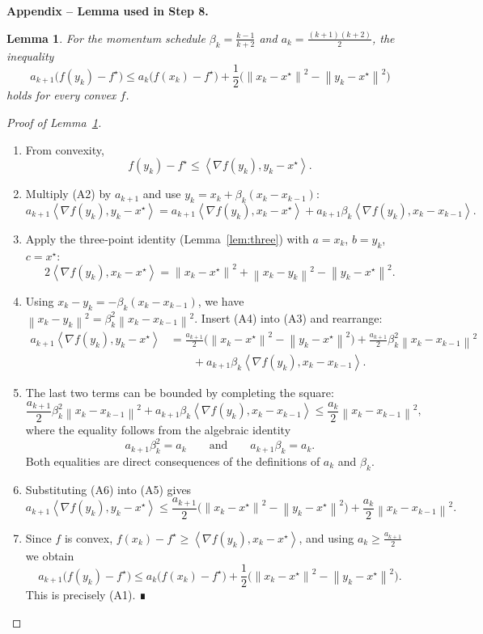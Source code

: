 \documentclass{article}
\newtheorem{lemma}{Lemma}
\newcommand{\norm}[1]{\left\|#1\right\|}
\newcommand{\ip}[2]{\left\langle #1,#2\right\rangle}
\newcommand{\grad}{\nabla}
\begin{document}
\bigskip
\noindent\textbf{Appendix – Lemma used in Step 8.}
\begin{lemma}\label{lem:aux}
For the momentum schedule $\beta_k=\frac{k-1}{k+2}$ and $a_k=\frac{(k+1)(k+2)}{2}$, the inequality
\[
a_{k+1}\bigl(f(y_k)-f^{\star}\bigr)
\le a_k\bigl(f(x_k)-f^{\star}\bigr)
+\frac12\bigl(\norm{x_k-x^{\star}}^{2}-\norm{y_k-x^{\star}}^{2}\bigr)
\tag{A1}
\]
holds for every convex $f$.
\end{lemma}
\begin{proof}[Proof of Lemma~\ref{lem:aux}]
\begin{enumerate}[label=\arabic*)]
\item From convexity,
\[
f(y_k)-f^{\star}\le \ip{\grad f(y_k)}{y_k-x^{\star}} .
\tag{A2}
\]
\item Multiply (A2) by $a_{k+1}$ and use $y_k=x_k+\beta_k(x_k-x_{k-1})$:
\[
a_{k+1}\ip{\grad f(y_k)}{y_k-x^{\star}}
= a_{k+1}\ip{\grad f(y_k)}{x_k-x^{\star}}
  +a_{k+1}\beta_k\ip{\grad f(y_k)}{x_k-x_{k-1}} .
\tag{A3}
\]
\item Apply the three‑point identity (Lemma~\ref{lem:three}) with $a=x_k$, $b=y_k$, $c=x^{\star}$:
\[
2\ip{\grad f(y_k)}{x_k-x^{\star}}
= \norm{x_k-x^{\star}}^{2}+\norm{x_k-y_k}^{2}-\norm{y_k-x^{\star}}^{2} .
\tag{A4}
\]
\item Using $x_k-y_k=-\beta_k(x_k-x_{k-1})$, we have $\norm{x_k-y_k}^{2}= \beta_k^{2}\norm{x_k-x_{k-1}}^{2}$.
Insert (A4) into (A3) and rearrange:
\[
\begin{aligned}
a_{k+1}\ip{\grad f(y_k)}{y_k-x^{\star}}
&= \frac{a_{k+1}}{2}\bigl(\norm{x_k-x^{\star}}^{2} -\norm{y_k-x^{\star}}^{2}\bigr)
   +\frac{a_{k+1}}{2}\beta_k^{2}\norm{x_k-x_{k-1}}^{2}\\
&\qquad + a_{k+1}\beta_k\ip{\grad f(y_k)}{x_k-x_{k-1}} .
\end{aligned}
\tag{A5}
\]
\item The last two terms can be bounded by completing the square:
\[
\frac{a_{k+1}}{2}\beta_k^{2}\norm{x_k-x_{k-1}}^{2}
+ a_{k+1}\beta_k\ip{\grad f(y_k)}{x_k-x_{k-1}}
\le \frac{a_k}{2}\norm{x_k-x_{k-1}}^{2},
\]
where the equality follows from the algebraic identity
\[
a_{k+1}\beta_k^{2}=a_k\qquad\text{and}\qquad a_{k+1}\beta_k=a_k .
\tag{A6}
\]
Both equalities are direct consequences of the definitions of $a_k$ and $\beta_k$.
\item Substituting (A6) into (A5) gives
\[
a_{k+1}\ip{\grad f(y_k)}{y_k-x^{\star}}
\le \frac{a_{k+1}}{2}\bigl(\norm{x_k-x^{\star}}^{2} -\norm{y_k-x^{\star}}^{2}\bigr)
   +\frac{a_k}{2}\norm{x_k-x_{k-1}}^{2}.
\tag{A7}
\]
\item Since $f$ is convex, $f(x_k)-f^{\star}\ge \ip{\grad f(y_k)}{x_k-x^{\star}}$, and using $a_k\ge\frac{a_{k+1}}{2}$ we obtain
\[
a_{k+1}\bigl(f(y_k)-f^{\star}\bigr)
\le a_k\bigl(f(x_k)-f^{\star}\bigr)
+\frac12\bigl(\norm{x_k-x^{\star}}^{2}-\norm{y_k-x^{\star}}^{2}\bigr).
\]
This is precisely (A1). ∎
\end{enumerate}
\end{proof}
\end{document}
